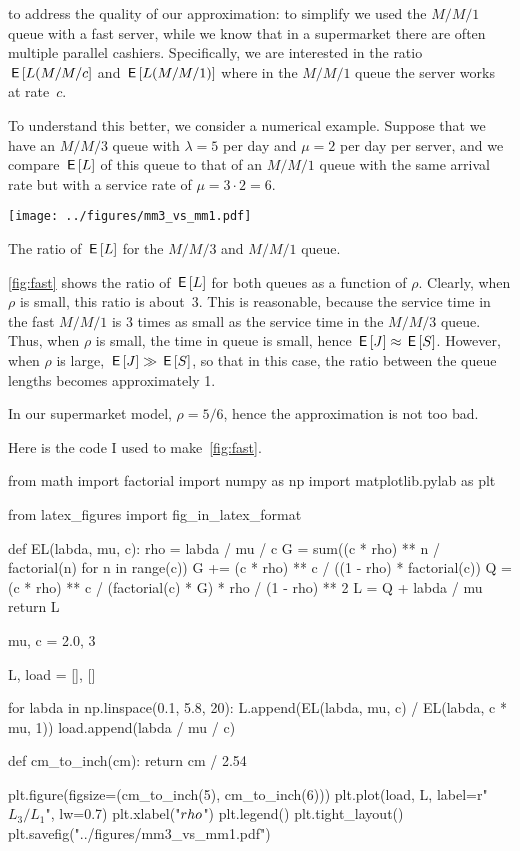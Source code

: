 \documentclass[stochastic-or.tex]{subfiles}
\begin{document}
 to address the quality of our approximation: to simplify we used the $M/M/1$ queue with a fast server, while we know that in a supermarket there are often multiple parallel cashiers. Specifically, we are interested in the ratio $\,\mathsf{E}\left[L(M/M/c\right]$ and $\,\mathsf{E}\left[L(M/M/1)\right]$ where in the $M/M/1$ queue the server works at rate~$c$.

To understand this better, we consider a numerical example.
Suppose that we have an $M/M/3$ queue with $\lambda = 5$ per day and $\mu=2$ per day per server, and we compare $\,\mathsf{E}\left[L\right]$ of this queue to that of an $M/M/1$ queue with the same arrival rate but with a service rate of $\mu = 3\cdot 2 = 6$.
\begin{marginfigure}
\texttt{[image: ../figures/mm3\_vs\_mm1.pdf]}
\caption{The ratio of $\,\mathsf{E}\left[L\right]$ for the $M/M/3$ and $M/M/1$ queue.}
\label{fig:fast}
\end{marginfigure}

\cref{fig:fast} shows  the ratio of $\,\mathsf{E}\left[L\right]$ for both queues as a function of $\rho$.
Clearly, when $\rho$ is small, this ratio is about~$3$.
This is reasonable, because the service time in the fast $M/M/1$ is 3 times as small as the service time in the $M/M/3$ queue.  Thus, when $\rho$ is small, the time in queue is small, hence $\,\mathsf{E}\left[J\right] \approx \,\mathsf{E}\left[S\right]$.
However, when $\rho$ is large, $\,\mathsf{E}\left[J\right] \gg \,\mathsf{E}\left[S\right]$, so that in this case, the ratio between the queue lengths becomes approximately 1.

In our supermarket model, $\rho=5/6$, hence the approximation is not too bad.

Here is the code I used to make~\cref{fig:fast}.
\begin{python}
from math import factorial
import numpy as np
import matplotlib.pylab as plt

from latex_figures import fig_in_latex_format


def EL(labda, mu, c):
    rho = labda / mu / c
    G = sum((c * rho) ** n / factorial(n) for n in range(c))
    G += (c * rho) ** c / ((1 - rho) * factorial(c))
    Q = (c * rho) ** c / (factorial(c) * G) * rho / (1 - rho) ** 2
    L = Q + labda / mu
    return L


mu, c = 2.0, 3

L, load = [], []

for labda in np.linspace(0.1, 5.8, 20):
    L.append(EL(labda, mu, c) / EL(labda, c * mu, 1))
    load.append(labda / mu / c)


def cm_to_inch(cm):
    return cm / 2.54


plt.figure(figsize=(cm_to_inch(5), cm_to_inch(6)))
plt.plot(load, L, label=r"$L_3/L_1$", lw=0.7)
plt.xlabel("$\\rho$")
plt.legend()
plt.tight_layout()
plt.savefig("../figures/mm3_vs_mm1.pdf")
\end{python}
\end{document}

